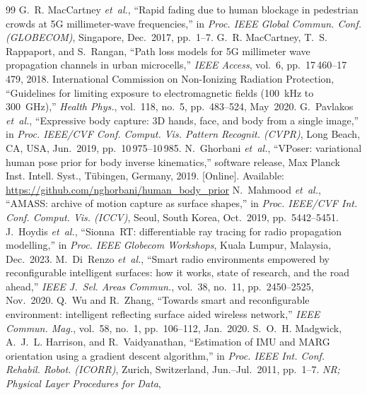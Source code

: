 \documentclass[journal,twocolumn,10pt]{IEEEtran}
\theoremstyle{plain}
\theoremstyle{definition}
\theoremstyle{remark}
\begin{document}
\begin{thebibliography}{99}
 G.~R. MacCartney \emph{et~al.}, ``Rapid
fading due to human blockage in pedestrian crowds at 5G
millimeter-wave frequencies,'' in \emph{Proc. IEEE Global Commun.
Conf. (GLOBECOM)}, Singapore, Dec.~2017, pp.~1--7.
 G.~R. MacCartney, T.~S. Rappaport,
and S.~Rangan, ``Path loss models for 5G millimeter wave
propagation channels in urban microcells,'' \emph{IEEE Access},
vol.~6, pp.~17\,460--17\,479, 2018.
 International Commission on Non-Ionizing
Radiation Protection, ``Guidelines for limiting exposure to
electromagnetic fields (100~kHz to 300~GHz),'' \emph{Health Phys.},
vol.~118, no.~5, pp.~483--524, May~2020.
 G.~Pavlakos \emph{et~al.}, ``Expressive body
capture: 3D hands, face, and body from a single image,'' in
\emph{Proc. IEEE/CVF Conf. Comput. Vis. Pattern Recognit. (CVPR)},
Long Beach, CA, USA, Jun.~2019, pp.~10\,975--10\,985.
 N.~Ghorbani \emph{et~al.}, ``VPoser:
variational human pose prior for body inverse kinematics,''
software release, Max Planck Inst. Intell. Syst., T\"ubingen,
Germany, 2019. [Online]. Available:
\url{https://github.com/nghorbani/human_body_prior}
 N.~Mahmood \emph{et~al.}, ``AMASS: archive of
motion capture as surface shapes,'' in \emph{Proc. IEEE/CVF Int.
Conf. Comput. Vis. (ICCV)}, Seoul, South Korea, Oct.~2019,
pp.~5442--5451.
 J.~Hoydis \emph{et~al.}, ``Sionna~RT:
differentiable ray tracing for radio propagation modelling,'' in
\emph{Proc. IEEE Globecom Workshops}, Kuala Lumpur, Malaysia,
Dec.~2023.
 M.~Di~Renzo \emph{et~al.}, ``Smart radio
environments empowered by reconfigurable intelligent surfaces:
how it works, state of research, and the road ahead,''
\emph{IEEE J.~Sel. Areas Commun.}, vol.~38, no.~11,
pp.~2450--2525, Nov.~2020.
 Q.~Wu and R.~Zhang, ``Towards smart and
reconfigurable environment: intelligent reflecting surface aided
wireless network,'' \emph{IEEE Commun. Mag.}, vol.~58, no.~1,
pp.~106--112, Jan.~2020.
 S.~O.~H. Madgwick, A.~J.~L. Harrison, and
R.~Vaidyanathan, ``Estimation of IMU and MARG orientation using a
gradient descent algorithm,'' in \emph{Proc. IEEE Int. Conf.
Rehabil. Robot. (ICORR)}, Zurich, Switzerland, Jun.--Jul.~2011,
pp.~1--7.
 \emph{NR; Physical Layer Procedures for Data},

\end{thebibliography}
\end{document}
